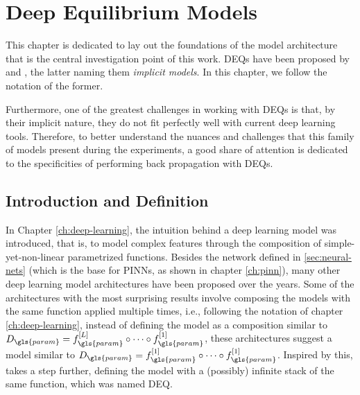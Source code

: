 \chapter{Deep Equilibrium Models}\label{ch:deq}

This chapter is dedicated to lay out the foundations of the model architecture that is the central investigation point of this work.
\gls{DEQ}s have been proposed by \textcite{Bai2019} and \textcite{Ghaoui2019}, the latter naming them \emph{implicit models}.
In this chapter, we follow the notation of the former.

Furthermore, one of the greatest challenges in working with \gls{DEQ}s is that, by their implicit nature, they do not fit perfectly well with current deep learning tools.
Therefore, to better understand the nuances and challenges that this family of models present during the experiments, a good share of attention is dedicated to the specificities of performing back propagation with \gls{DEQ}s.

\section{Introduction and Definition}\label{sec:deq-definition}

In Chapter \ref{ch:deep-learning}, the intuition behind a deep learning model was introduced, that is, to model complex features through the composition of simple-yet-non-linear parametrized functions.
Besides the network defined in \ref{sec:neural-nets} (which is the base for \gls{PINN}s, as shown in chapter \ref{ch:pinn}), many other deep learning model architectures have been proposed over the years.
    Some of the architectures with the most surprising results involve composing the models with the same function applied multiple times, i.e., following the notation of chapter \ref{ch:deep-learning}, instead of defining the model as a composition similar to $D_{\gls{param}}=f_{\gls{param}}^{[L]}\circ \cdots \circ f_{\gls{param}}^{[1]}$, these architectures suggest a model similar to $D_{\gls{param}}=f_{\gls{param}}^{[1]}\circ \cdots \circ f_{\gls{param}}^{[1]}$.
Inspired by this, \textcite{Bai2019} takes a step further, defining the model with a (possibly) infinite stack of the same function, which was named \gls{DEQ}.


